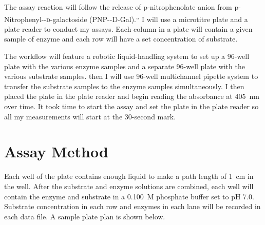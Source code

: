 \documentclass[]{tufte-handout}
\begin{document}
The assay reaction will follow the release of p-nitrophenolate anion from p-Nitrophenyl-\textbeta -\textsc{d}-galactoside (PNP-\textbeta-D-Gal).\textsuperscript{,}\textsuperscript{,} I will use a microtitre plate and a plate reader to conduct my assays. Each column in a plate will contain a given sample of enzyme and each row will have a set concentration of substrate.

The workflow will feature a robotic liquid-handling system to set up a 96-well plate with the various enzyme samples and a separate 96-well plate with the various substrate samples. then I will use  96-well multichannel pipette system to transfer the substrate samples to the enzyme samples simultaneously. I then placed the plate in the plate reader and begin reading the absorbance at \qty{405}{nm} over time. It took time to start the assay and set the plate in the plate reader so all my measurements will start at the 30-second mark. 

\section{Assay Method}

Each well of the plate contains enough liquid to make a path length of \qty{1}{cm} in the well. After the substrate and enzyme solutions are combined, each well will contain the enzyme and substrate in a \qty{0.100}{M} phosphate buffer set to pH 7.0. Substrate concentration in each row and enzymes in each lane will be recorded in each data file. A sample plate plan is shown below.
\end{document}
